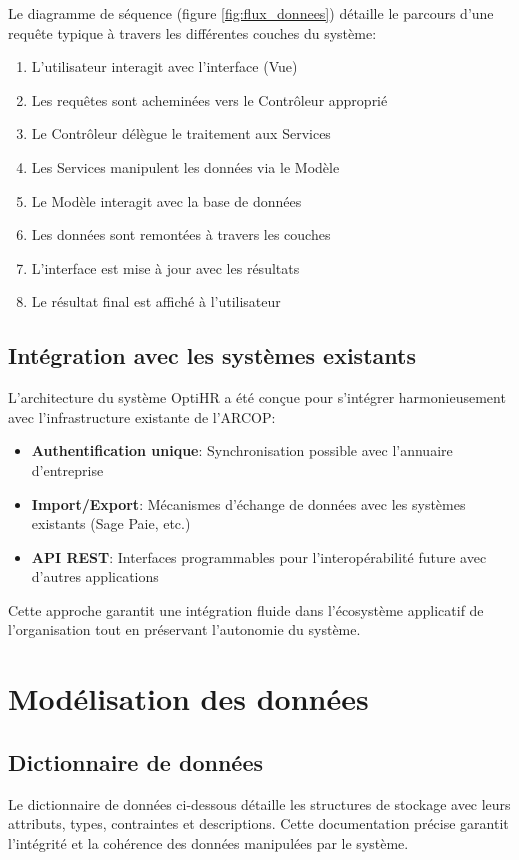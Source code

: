Le diagramme de séquence (figure \ref{fig:flux_donnees}) détaille le parcours d'une requête typique à travers les différentes couches du système:

\begin{enumerate}
    \item L'utilisateur interagit avec l'interface (Vue)
    \item Les requêtes sont acheminées vers le Contrôleur approprié
    \item Le Contrôleur délègue le traitement aux Services
    \item Les Services manipulent les données via le Modèle
    \item Le Modèle interagit avec la base de données
    \item Les données sont remontées à travers les couches
    \item L'interface est mise à jour avec les résultats
    \item Le résultat final est affiché à l'utilisateur
\end{enumerate}

\subsection{Intégration avec les systèmes existants}
L'architecture du système OptiHR a été conçue pour s'intégrer harmonieusement avec l'infrastructure existante de l'ARCOP:

\begin{itemize}
    \item \textbf{Authentification unique}: Synchronisation possible avec l'annuaire d'entreprise
    \item \textbf{Import/Export}: Mécanismes d'échange de données avec les systèmes existants (Sage Paie, etc.)
    \item \textbf{API REST}: Interfaces programmables pour l'interopérabilité future avec d'autres applications
\end{itemize}

Cette approche garantit une intégration fluide dans l'écosystème applicatif de l'organisation tout en préservant l'autonomie du système.

\section{Modélisation des données}

\subsection{Dictionnaire de données}
Le dictionnaire de données ci-dessous détaille les structures de stockage avec leurs attributs, 
types, contraintes et descriptions. Cette documentation précise garantit l'intégrité et 
la cohérence des données manipulées par le système.

